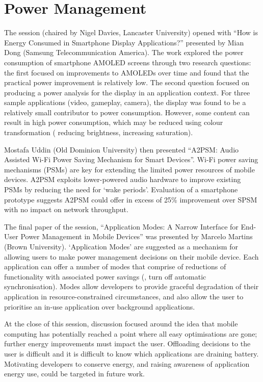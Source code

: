 \section{Power Management}
\label{sec:power}
The session (chaired by Nigel Davies, Lancaster University)
opened with
``How is Energy Consumed in Smartphone Display Applications?'' presented by Mian Dong (Samsung Telecommunication America). The work explored
the power consumption of smartphone AMOLED screens through two research questions: the first focused on improvements to AMOLEDs over time
and found that the practical power improvement is relatively low.
The second question focused on 
producing a power analysis for the display in an application context. For three 
sample applications (video, gameplay, camera), the display was found to be a 
relatively small contributor to power consumption. However, some content can result in high power consumption, which may be reduced using colour 
transformation (\eg{} reducing brightness, increasing saturation).

Mostafa Uddin (Old Dominion University) then presented ``A2PSM: Audio Assisted 
Wi-Fi Power Saving Mechanism for Smart Devices''. Wi-Fi power saving mechanisms 
(PSMs) are key for extending the limited power resources of mobile devices. 
A2PSM exploits lower-powered audio hardware to 
improve existing PSMs by reducing the need for `wake periods'. 
Evaluation of a smartphone prototype suggests A2PSM could offer in excess of 25\%
improvement over SPSM with no impact on network throughput.

The final paper of the session, ``Application Modes: A Narrow Interface for End-
User Power Management in Mobile Devices'' was presented by Marcelo Martins (Brown 
University). `Application Modes' are suggested as a mechanism for allowing 
users to make power management decisions on their mobile device. Each 
application can offer a number of modes that comprise of reductions of 
functionality with associated power savings (\eg{}, turn off automatic 
synchronisation). Modes allow developers to provide graceful degradation of their 
application in resource-constrained circumstances, and also allow the user to 
prioritise an in-use application over background applications.

At the close of this session, discussion focused around the idea
that mobile computing has potentially reached a point where all easy 
optimisations are gone; further energy improvements must impact the 
user. Offloading decisions to the user is difficult and it is difficult to 
know which applications are draining battery. Motivating 
developers to conserve energy, and raising awareness of application energy use, 
could be targeted in future work. %
